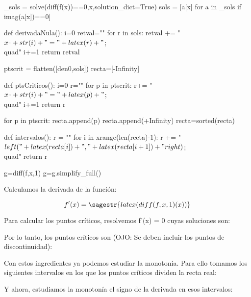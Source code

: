 \begin{sagesilent}

_sols = solve(diff(f(x))==0,x,solution_dict=True)
sols = [a[x] for a in _sols if imag(a[x])==0]

def derivadaNula():
    i=0
    retval=""
    for r in sols:
        retval += "$x_"+str(i)+" = "+latex(r)+"$;\\quad"
        i+=1
    return retval

ptscrit = flatten([den0,sols])
recta=[-Infinity]

def ptsCriticos():
    i=0
    r=""
    for p in ptscrit:
        r+= "$x_"+str(i)+"="+latex(p)+"$;\\quad"
        i+=1
    return r

for p in ptscrit:
     recta.append(p)
recta.append(+Infinity)
recta=sorted(recta)

def intervalos():
    r = ""
    for i in xrange(len(recta)-1):
        r += "$\\left("+latex(recta[i])+","+latex(recta[i+1])+"\\right)$;\\quad"  
    return r

g=diff(f,x,1)
g=g.simplify_full()
\end{sagesilent}

Calculamos la derivada de la función:

\[f'(x) = \sagestr{latex(diff(f,x,1)(x))} \]%

Para calcular los puntos críticos, resolvemos f'(x) = 0 cuyas soluciones son: 

Por lo tanto, los puntos críticos son (OJO: Se deben incluir los puntos de discontinuidad): 


Con estos ingredientes ya podemos estudiar la monotonía. Para ello tomamos los siguientes intervalos en los que los puntos críticos dividen la recta real:


Y ahora, estudiamos la monotonía el signo de la derivada en esos intervalos:
   
